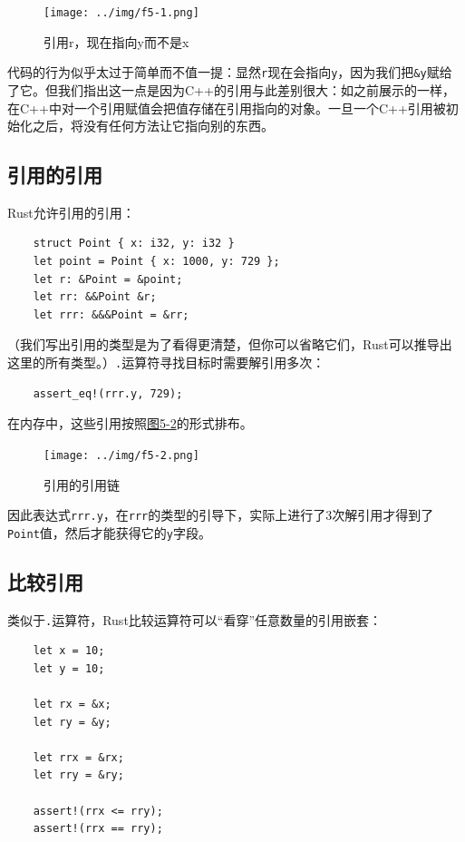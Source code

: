 \begin{figure}[htbp]
    \centering
    \texttt{[image: ../img/f5-1.png]}
    \caption{引用r，现在指向y而不是x}
    \label{f5-1}
\end{figure}

代码的行为似乎太过于简单而不值一提：显然\texttt{r}现在会指向\texttt{y}，因为我们把\texttt{\&y}赋给了它。但我们指出这一点是因为C++的引用与此差别很大：如之前展示的一样，在C++中对一个引用赋值会把值存储在引用指向的对象。一旦一个C++引用被初始化之后，将没有任何方法让它指向别的东西。

\subsection{引用的引用}
Rust允许引用的引用：
\begin{verbatim}
    struct Point { x: i32, y: i32 }
    let point = Point { x: 1000, y: 729 };
    let r: &Point = &point;
    let rr: &&Point &r;
    let rrr: &&&Point = &rr;
\end{verbatim}

（我们写出引用的类型是为了看得更清楚，但你可以省略它们，Rust可以推导出这里的所有类型。）\texttt{.}运算符寻找目标时需要解引用多次：
\begin{verbatim}
    assert_eq!(rrr.y, 729);
\end{verbatim}

在内存中，这些引用按照\hyperref[f5-2]{图5-2}的形式排布。

\begin{figure}[htbp]
    \centering
    \texttt{[image: ../img/f5-2.png]}
    \caption{引用的引用链}
    \label{f5-2}
\end{figure}

因此表达式\texttt{rrr.y}，在\texttt{rrr}的类型的引导下，实际上进行了3次解引用才得到了\texttt{Point}值，然后才能获得它的\texttt{y}字段。

\subsection{比较引用}

类似于\texttt{.}运算符，Rust比较运算符可以“看穿”任意数量的引用嵌套：
\begin{verbatim}
    let x = 10;
    let y = 10;

    let rx = &x;
    let ry = &y;

    let rrx = &rx;
    let rry = &ry;

    assert!(rrx <= rry);
    assert!(rrx == rry);
\end{verbatim}

